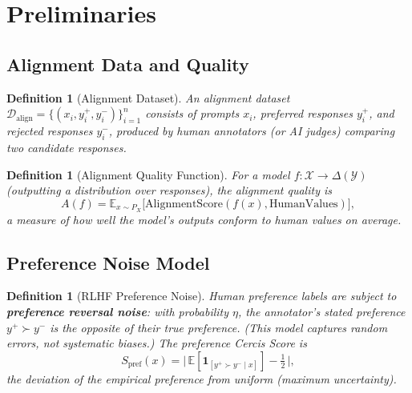 \documentclass[12pt,a4paper]{article}
\newtheorem{definition}[theorem]{Definition}
\newcommand{\E}{\mathbb{E}}
\newcommand{\cX}{\mathcal{X}}
\newcommand{\cY}{\mathcal{Y}}
\newcommand{\cD}{\mathcal{D}}
\newcommand{\ind}[1]{\mathbf{1}_{[#1]}}
\begin{document}
\section{Preliminaries}

\subsection{Alignment Data and Quality}

\begin{definition}[Alignment Dataset]
\label{def:align-data}
An alignment dataset $\cD_{\mathrm{align}}=\{(x_i,y_i^+,y_i^-)\}_{i=1}^n$
consists of prompts $x_i$, preferred responses $y_i^+$, and rejected responses
$y_i^-$, produced by human annotators (or AI judges) comparing two candidate
responses.
\end{definition}

\begin{definition}[Alignment Quality Function]
\label{def:align-quality}
For a model $f:\cX\to\Delta(\cY)$ (outputting a distribution over responses),
the alignment quality is
\begin{equation}\label{eq:A-f}
    A(f) = \E_{x\sim P_X}\big[\mathrm{AlignmentScore}(f(x),
           \mathrm{HumanValues})\big],
\end{equation}
a measure of how well the model's outputs conform to human values on average.
\end{definition}

\subsection{Preference Noise Model}

\begin{definition}[RLHF Preference Noise]
\label{def:pref-noise}
Human preference labels are subject to \textbf{preference reversal noise}: with
probability $\eta$, the annotator's stated preference $y^+\succ y^-$ is the
\emph{opposite} of their true preference.  (This model captures random errors,
not systematic biases.)  The preference Cercis Score is
\begin{equation}\label{eq:S-pref}
    S_{\mathrm{pref}}(x) = \big|\,\E[\ind{y^+\succ y^-\mid x}] - \tfrac12\,\big|,
\end{equation}
the deviation of the empirical preference from uniform (maximum uncertainty).
\end{definition}
\end{document}
